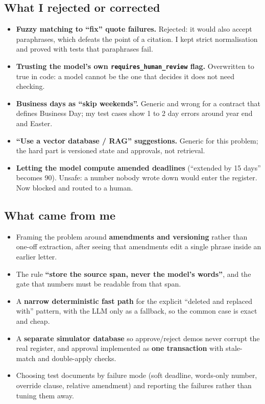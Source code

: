 \documentclass[10pt,a4paper]{article}
\newcommand{\code}[1]{\texttt{\small #1}}
\begin{document}
\subsection{What I rejected or corrected}\leavevmode
\begin{itemize}
  \item \textbf{Fuzzy matching to ``fix'' quote failures.} Rejected: it would also accept paraphrases, which defeats the point of a citation. I kept strict normalisation and proved with tests that paraphrases fail.
  \item \textbf{Trusting the model's own \code{requires\_human\_review} flag.} Overwritten to true in code: a model cannot be the one that decides it does not need checking.
  \item \textbf{Business days as ``skip weekends''.} Generic and wrong for a contract that defines Business Day; my test cases show 1 to 2 day errors around year end and Easter.
  \item \textbf{``Use a vector database / RAG'' suggestions.} Generic for this problem; the hard part is versioned state and approvals, not retrieval.
  \item \textbf{Letting the model compute amended deadlines} (``extended by 15 days'' becomes 90). Unsafe: a number nobody wrote down would enter the register. Now blocked and routed to a human.
\end{itemize}

\subsection{What came from me}\leavevmode
\begin{itemize}
  \item Framing the problem around \textbf{amendments and versioning} rather than one-off extraction, after seeing that amendments edit a single phrase inside an earlier letter.
  \item The rule \textbf{``store the source span, never the model's words''}, and the gate that numbers must be readable from that span.
  \item A \textbf{narrow deterministic fast path} for the explicit ``deleted and replaced with'' pattern, with the LLM only as a fallback, so the common case is exact and cheap.
  \item A \textbf{separate simulator database} so approve/reject demos never corrupt the real register, and approval implemented as \textbf{one transaction} with stale-match and double-apply checks.
  \item Choosing test documents by failure mode (soft deadline, words-only number, override clause, relative amendment) and reporting the failures rather than tuning them away.
\end{itemize}
\end{document}
